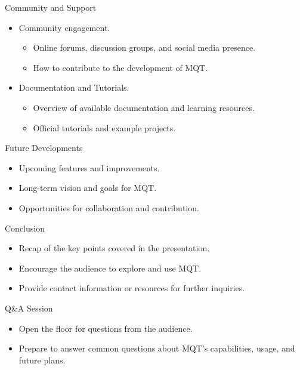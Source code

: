 \documentclass{beamer}
\begin{document}
\begin{frame}{Community and Support}
    \begin{itemize}
        \item Community engagement.
        \begin{itemize}
            \item Online forums, discussion groups, and social media presence.
            \item How to contribute to the development of MQT.
        \end{itemize}
        \item Documentation and Tutorials.
        \begin{itemize}
            \item Overview of available documentation and learning resources.
            \item Official tutorials and example projects.
        \end{itemize}
    \end{itemize}
\end{frame}

\begin{frame}{Future Developments}
    \begin{itemize}
        \item Upcoming features and improvements.
        \item Long-term vision and goals for MQT.
        \item Opportunities for collaboration and contribution.
    \end{itemize}
\end{frame}

\begin{frame}{Conclusion}
    \begin{itemize}
        \item Recap of the key points covered in the presentation.
        \item Encourage the audience to explore and use MQT.
        \item Provide contact information or resources for further inquiries.
    \end{itemize}
\end{frame}

\begin{frame}{Q\&A Session}
    \begin{itemize}
        \item Open the floor for questions from the audience.
        \item Prepare to answer common questions about MQT's capabilities, usage, and future plans.
    \end{itemize}
\end{frame}
\end{document}
